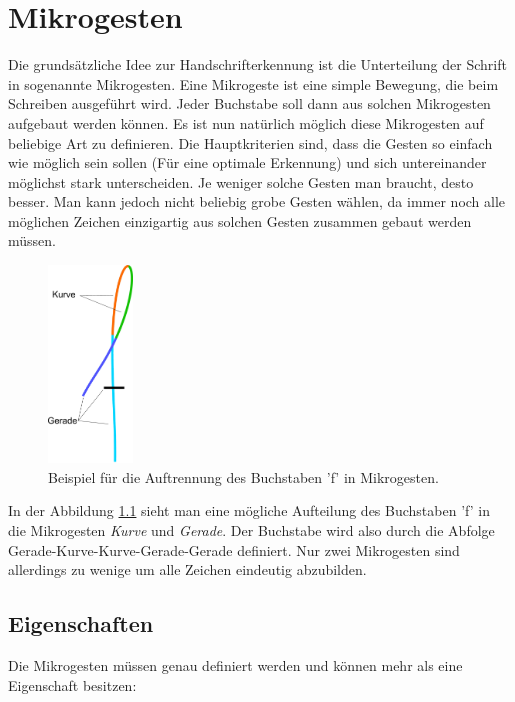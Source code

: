 \chapter{Mikrogesten}

Die grundsätzliche Idee zur Handschrifterkennung ist die Unterteilung der Schrift in sogenannte Mikrogesten. Eine Mikrogeste ist eine simple Bewegung, die beim Schreiben ausgeführt wird. Jeder Buchstabe soll dann aus solchen Mikrogesten aufgebaut werden können. 
Es ist nun natürlich möglich diese Mikrogesten auf beliebige Art zu definieren. Die Hauptkriterien sind, dass die Gesten so einfach wie möglich sein sollen (Für eine optimale Erkennung) und sich untereinander möglichst stark unterscheiden. Je weniger solche Gesten man braucht, desto besser. Man kann jedoch nicht beliebig grobe Gesten wählen, da immer noch alle möglichen Zeichen einzigartig aus solchen Gesten zusammen gebaut werden müssen.

\begin{figure}[h!]
  \centering
    \includegraphics[width=0.2\textwidth]{./img/mikrogesten_beispiel.pdf}
  \caption{Beispiel für die Auftrennung des Buchstaben 'f' in Mikrogesten.}
  \label{mikrogeste_beispiel}
\end{figure}

In der Abbildung \ref{mikrogeste_beispiel} sieht man eine mögliche Aufteilung des Buchstaben 'f' in die Mikrogesten \emph{Kurve} und \emph{Gerade}. Der Buchstabe wird also durch die Abfolge Gerade-Kurve-Kurve-Gerade-Gerade definiert. Nur zwei Mikrogesten sind allerdings zu wenige um alle Zeichen eindeutig abzubilden.

\section{Eigenschaften}
Die Mikrogesten müssen genau definiert werden und können mehr als eine Eigenschaft besitzen:

